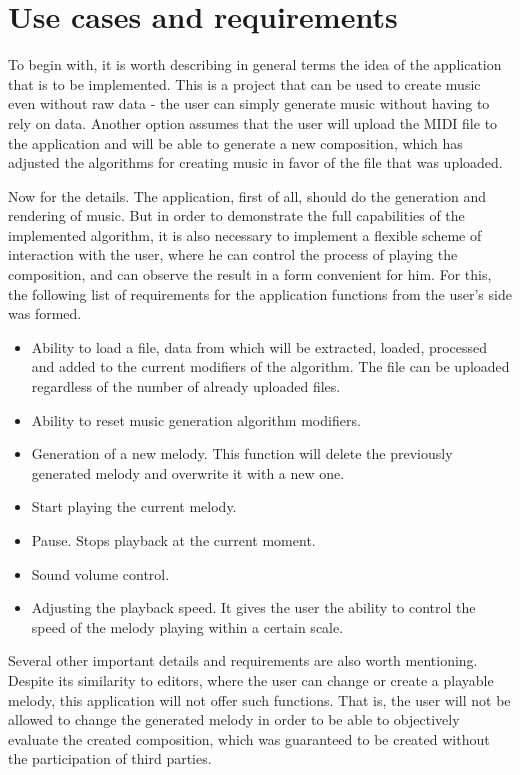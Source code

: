 \documentclass[thesis=B,english]{FITthesis}[2019/12/23]
\begin{document}
\section{Use cases and requirements}

To begin with, it is worth describing in general terms the idea of the application that is to be implemented. This is a project that can be used to create music even without raw data - the user can simply generate music without having to rely on data. Another option assumes that the user will upload the MIDI file to the application and will be able to generate a new composition, which has adjusted the algorithms for creating music in favor of the file that was uploaded.

Now for the details. The application, first of all, should do the generation and rendering of music. But in order to demonstrate the full capabilities of the implemented algorithm, it is also necessary to implement a flexible scheme of interaction with the user, where he can control the process of playing the composition, and can observe the result in a form convenient for him. For this, the following list of requirements for the application functions from the user's side was formed.

\begin{itemize}
   \item Ability to load a file, data from which will be extracted, loaded, processed and added to the current modifiers of the algorithm. The file can be uploaded regardless of the number of already uploaded files.
   \item Ability to reset music generation algorithm modifiers.
   \item Generation of a new melody. This function will delete the previously generated melody and overwrite it with a new one.
   \item Start playing the current melody.
   \item Pause. Stops playback at the current moment.
   \item Sound volume control.
   \item Adjusting the playback speed. It gives the user the ability to control the speed of the melody playing within a certain scale.
\end{itemize}

Several other important details and requirements are also worth mentioning. Despite its similarity to editors, where the user can change or create a playable melody, this application will not offer such functions. That is, the user will not be allowed to change the generated melody in order to be able to objectively evaluate the created composition, which was guaranteed to be created without the participation of third parties.
\end{document}

